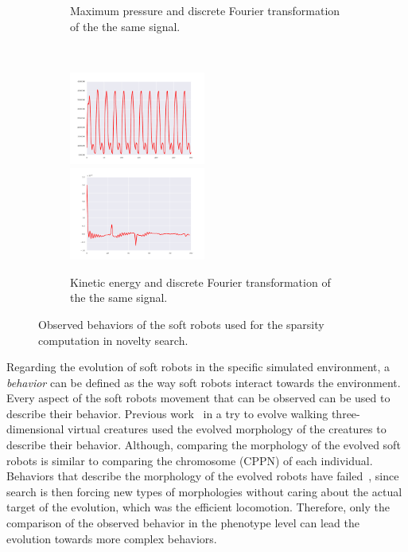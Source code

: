 \documentclass{sig-alternate}
\begin{document}
\begin{figure}[t!]
\begin{subfigure}[b]{0.25\textwidth}
\caption{Maximum pressure and discrete Fourier transformation of the the same signal.}
\end{subfigure}~
\begin{subfigure}[b]{0.25\textwidth}
\centering
\includegraphics[width=0.49\textwidth]{../Figures/Behaviors/ke.pdf}~
\includegraphics[width=0.49\textwidth]{../Figures/Behaviors/kedft.pdf}
\caption{Kinetic energy and discrete Fourier transformation of the the same signal.}
\end{subfigure}
\caption{Observed behaviors of the soft robots used for the sparsity computation in novelty search.}
\label{fig:Behaviors}
\vspace{-15pt}
\end{figure}

Regarding the evolution of soft robots in the specific simulated environment, a \emph{behavior} can be defined as the way soft robots interact towards the environment. Every aspect of the soft robots movement that can be observed can be used to describe their behavior. Previous work~\cite{lehman2011evolving} in a try to evolve walking three-dimensional virtual creatures used the evolved morphology of the creatures to describe their behavior. Although, comparing the morphology of the evolved soft robots is similar to comparing the chromosome (CPPN) of each individual. Behaviors that describe the morphology of the evolved robots have failed~\cite{lehman2011evolving}, since search is then forcing new types of morphologies without caring about the actual target of the evolution, which was the efficient locomotion. Therefore, only the comparison of the observed behavior in the phenotype level can lead the evolution towards more complex behaviors. 
\end{document}
